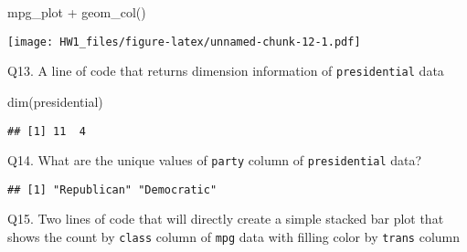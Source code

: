 \documentclass[
]{article}
\newenvironment{Shaded}{\begin{snugshade}}{\end{snugshade}}
\newcommand{\AttributeTok}[1]{\textcolor[rgb]{0.77,0.63,0.00}{#1}}
\newcommand{\FunctionTok}[1]{\textcolor[rgb]{0.00,0.00,0.00}{#1}}
\newcommand{\NormalTok}[1]{#1}
\newcommand{\OtherTok}[1]{\textcolor[rgb]{0.56,0.35,0.01}{#1}}
\newcommand{\SpecialCharTok}[1]{\textcolor[rgb]{0.00,0.00,0.00}{#1}}
\newcommand{\StringTok}[1]{\textcolor[rgb]{0.31,0.60,0.02}{#1}}
\begin{document}
\begin{Shaded}
\begin{Highlighting}[]
\NormalTok{mpg\_plot }\SpecialCharTok{+}
  \FunctionTok{geom\_col}\NormalTok{()}
\end{Highlighting}
\end{Shaded}

\texttt{[image: HW1\_files/figure-latex/unnamed-chunk-12-1.pdf]}

Q13. A line of code that returns dimension information of
\texttt{presidential} data

\begin{Shaded}
\begin{Highlighting}[]
\FunctionTok{dim}\NormalTok{(presidential)}
\end{Highlighting}
\end{Shaded}

\begin{verbatim}
## [1] 11  4
\end{verbatim}

Q14. What are the unique values of \texttt{party} column of
\texttt{presidential} data?

\begin{Shaded}
\end{Shaded}

\begin{verbatim}
## [1] "Republican" "Democratic"
\end{verbatim}

Q15. Two lines of code that will directly create a simple stacked bar
plot that shows the count by \texttt{class} column of \texttt{mpg} data
with filling color by \texttt{trans} column

\begin{Shaded}
\end{Shaded}
\end{document}
